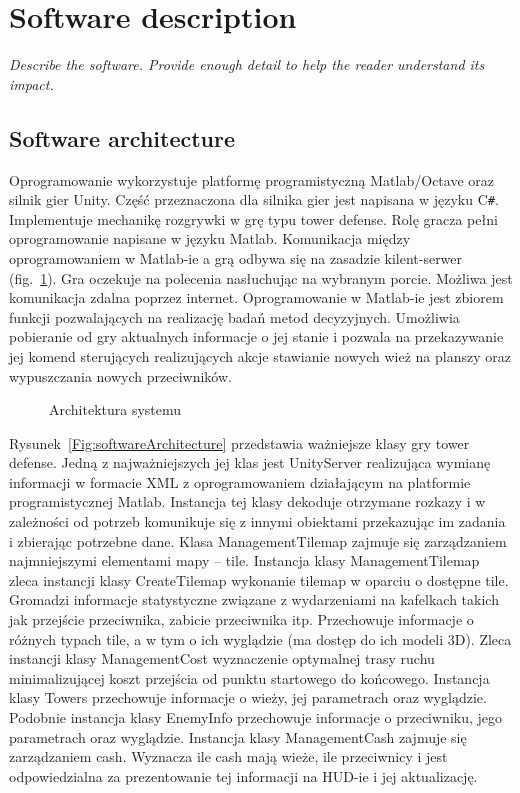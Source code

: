 
\section{Software description}

\textit{Describe the software. Provide enough detail to help the reader understand its impact. }

\subsection{Software architecture}

Oprogramowanie \SoftwareName wykorzystuje platformę programistyczną Matlab/Octave oraz silnik gier Unity. Część przeznaczona  dla silnika gier jest napisana w języku C\verb|#|. Implementuje mechanikę rozgrywki w grę typu tower defense. Rolę gracza pełni oprogramowanie napisane w języku Matlab. Komunikacja między oprogramowaniem w Matlab-ie a grą odbywa się na zasadzie kilent-serwer  (fig.~\ref{Fig:architecture}). Gra oczekuje na polecenia nasłuchując na wybranym porcie. Możliwa jest komunikacja zdalna poprzez internet. Oprogramowanie w Matlab-ie  jest zbiorem funkcji pozwalających na realizację badań metod decyzyjnych. Umożliwia pobieranie od gry aktualnych informacje o jej stanie i pozwala na  przekazywanie jej komend sterujących realizujących akcje stawianie nowych wież na planszy oraz wypuszczania nowych przeciwników. 

\begin{figure}

\caption{Architektura systemu}
\label{Fig:architecture}
\end{figure}

Rysunek~\ref{Fig:softwareArchitecture} przedstawia ważniejsze klasy gry tower defense. Jedną z najważniejszych jej klas jest UnityServer realizująca wymianę informacji w formacie XML z oprogramowaniem działającym na platformie programistycznej Matlab. Instancja tej klasy dekoduje otrzymane rozkazy i w zależności od potrzeb komunikuje się z innymi obiektami przekazując im zadania i zbierając potrzebne dane. Klasa ManagementTilemap zajmuje się zarządzaniem najmniejszymi elementami mapy -- tile. Instancja klasy ManagementTilemap zleca instancji klasy CreateTilemap wykonanie tilemap w oparciu o dostępne tile. Gromadzi informacje statystyczne związane z wydarzeniami na kafelkach takich jak przejście  przeciwnika, zabicie przeciwnika itp. Przechowuje informacje o różnych typach tile, a w tym o ich wyglądzie (ma dostęp do ich modeli 3D). Zleca instancji klasy ManagementCost wyznaczenie optymalnej trasy ruchu minimalizującej koszt przejścia od punktu startowego do końcowego. Instancja klasy Towers przechowuje informacje o wieży, jej parametrach oraz wyglądzie. Podobnie instancja klasy EnemyInfo przechowuje informacje o przeciwniku, jego parametrach oraz wyglądzie. Instancja klasy ManagementCash zajmuje się zarządzaniem cash. Wyznacza ile cash mają wieże, ile przeciwnicy i jest odpowiedzialna za prezentowanie tej informacji na HUD-ie i jej aktualizację.  

